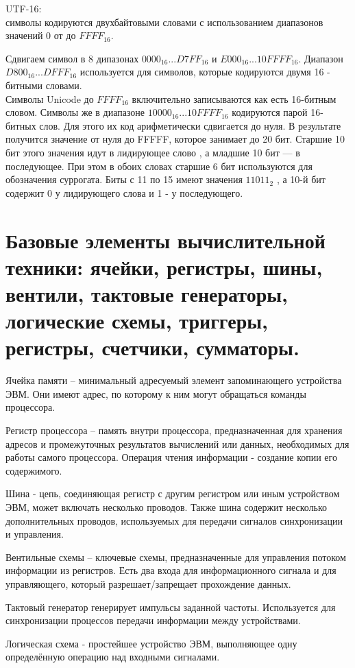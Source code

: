 \documentclass{article}
\begin{document}
UTF-16:\\
символы кодируются двухбайтовыми словами с использованием диапазонов
значений $0$ от до $FFFF_{16}$.

Сдвигаем символ в 8 дипазонах $0000_{16}...D7FF_{16}$ и $E000_{16}...10FFFF_{16}$. 
Диапазон $D800_{16}...DFFF_{16}$ используется для символов, которые кодируются двумя 16 - битными словами.\\
Символы Unicode до $FFFF_{16}$ включительно записываются как есть 16-битным словом. Символы же в диапазоне $10000_{16}...10FFFF_{16}$ кодируются парой 16-битных
слов. Для этого их код арифметически сдвигается до нуля. В результате получится значение от нуля до FFFFF, которое занимает до 20 бит. Старшие 10 бит этого значения идут в лидирующее слово
, а младшие 10 бит — в последующее. При этом в обоих словах старшие 6 бит используются для обозначения суррогата. Биты с 11 по 15 имеют значения $11011_2$ , а 10-й бит содержит 0 у лидирующего слова и 1 - у последующего.

\section{Базовые элементы вычислительной техники: ячейки, регистры, шины, вентили, тактовые генераторы, логические схемы, триггеры, регистры, счетчики, сумматоры.}
Ячейка памяти – минимальный адресуемый элемент запоминающего устройства ЭВМ.
Они имеют адрес, по которому к ним могут обращаться команды процессора.


Регистр процессора – память внутри процессора, предназначенная для хранения адресов и промежуточных результатов вычислений или данных, необходимых для работы самого процессора. 
Операция чтения информации - создание копии его содержимого.


Шина - цепь, соединяющая регистр с другим регистром или иным устройством ЭВМ, может включать несколько проводов.
Также шина содержит несколько дополнительных проводов, используемых для передачи сигналов синхронизации и управления.


Вентильные схемы – ключевые схемы, предназначенные для управления потоком информации из регистров. Есть два входа для информационного сигнала и для управляющего, который разрешает/запрещает прохождение данных.


Тактовый генератор генерирует импульсы заданной частоты. Используется для синхронизации процессов передачи информации между устройствами.


Логическая схема - простейшее устройство ЭВМ, выполняющее одну определённую операцию над входными сигналами.
\end{document}

